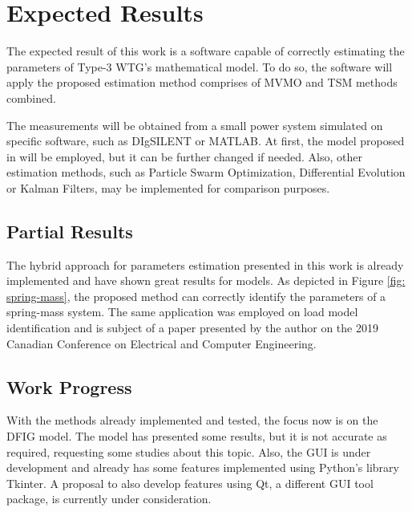 \chapter{Expected Results}

\label{ch: Res}

The expected result of this work is a software capable of correctly estimating the parameters of Type-3 WTG's mathematical model. To do so, the software will apply the proposed estimation method comprises of MVMO and TSM methods combined. 

The measurements will be obtained from a small power system simulated on specific software, such as DIgSILENT or MATLAB. At first, the model proposed in \cite{Erlic} will be employed, but it can be further changed if needed. Also, other estimation methods, such as Particle Swarm Optimization, Differential Evolution or Kalman Filters, may be implemented for comparison purposes.

\section{Partial Results}

The hybrid approach for parameters estimation presented in this work is already implemented and have shown great results for models. As depicted in Figure \ref{fig: spring-mass}, the proposed method can correctly identify the parameters of a spring-mass system. The same application was employed on load model identification and is subject of a paper presented by the author on the 2019 Canadian Conference on Electrical and Computer Engineering.

\section{Work Progress}

With the methods already implemented and tested, the focus now is on the DFIG model. The model has presented some results, but it is not accurate as required, requesting some studies about this topic. Also, the GUI is under development and already has some features implemented using Python's library Tkinter. A proposal to also develop features using Qt, a different GUI tool package, is currently under consideration.
